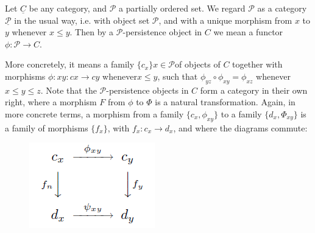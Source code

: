 \documentclass[11pt,reqno,oneside,a4paper]{article}
\begin{document}
\begin{defn}
	Let $\underline{C}$ be any category, and $\mathcal{P}$ a partially ordered set. We regard $\mathcal{P}$
	as a category $\underline{\mathcal{P}}$ in the usual way, i.e. with object set $\mathcal{P}$, and with a unique morphism	from $x$ to $y$ whenever $x \leq y$. Then by a $\mathcal{P}$-persistence object in $C$ we mean a functor
	$\phi : \mathcal{P} \to C$.
	
	 More concretely, it means a family $\{c_x\}{x\in \mathcal{P}} $of objects of $C$ together with morphisms $\phi: xy : cx \to cy$ whenever$ x \leq y$, such that $\phi_{yz} \circ \phi_{xy} = \phi_{xz}$ whenever $x \leq y \leq z$. Note that the $\mathcal{P}$-persistence objects in $C$ form a category in their own	right, where a morphism $F$ from $\phi$ to $\Phi$ is a natural transformation. Again, in
	more concrete terms, a morphism from a family $\{c_x, \phi_{xy}\}$ to a family $\{d_x, \Phi_{xy}\}$ is a family of morphisms $\{f_x\}$, with $f_x : c_x \to d_x$, and where the diagrams commute:
	\begin{figure}[H]
		\centering
		\includegraphics[width=0.3\linewidth]{gfx/tda5-1}
		\label{fig:tda5-1}
	\end{figure}
\end{defn}



{\small}
\end{document}
